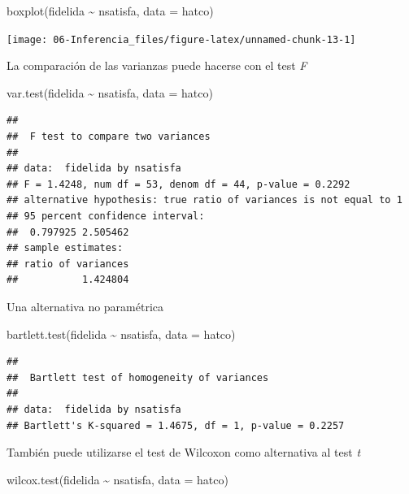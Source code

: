 \documentclass[
]{book}
\newenvironment{Shaded}{\begin{snugshade}}{\end{snugshade}}
\newcommand{\AttributeTok}[1]{\textcolor[rgb]{0.77,0.63,0.00}{#1}}
\newcommand{\FunctionTok}[1]{\textcolor[rgb]{0.00,0.00,0.00}{#1}}
\newcommand{\NormalTok}[1]{#1}
\newcommand{\SpecialCharTok}[1]{\textcolor[rgb]{0.00,0.00,0.00}{#1}}
\theoremstyle{break}
\theoremstyle{nonumberplain}
\begin{document}
\begin{Shaded}
\begin{Highlighting}[]
\FunctionTok{boxplot}\NormalTok{(fidelida }\SpecialCharTok{\textasciitilde{}}\NormalTok{ nsatisfa, }\AttributeTok{data =}\NormalTok{ hatco)}
\end{Highlighting}
\end{Shaded}

\begin{center}\texttt{[image: 06-Inferencia\_files/figure-latex/unnamed-chunk-13-1]} \end{center}

La comparación de las varianzas puede hacerse con el test \emph{F}

\begin{Shaded}
\begin{Highlighting}[]
\FunctionTok{var.test}\NormalTok{(fidelida }\SpecialCharTok{\textasciitilde{}}\NormalTok{ nsatisfa, }\AttributeTok{data =}\NormalTok{ hatco)}
\end{Highlighting}
\end{Shaded}

\begin{verbatim}
## 
##  F test to compare two variances
## 
## data:  fidelida by nsatisfa
## F = 1.4248, num df = 53, denom df = 44, p-value = 0.2292
## alternative hypothesis: true ratio of variances is not equal to 1
## 95 percent confidence interval:
##  0.797925 2.505462
## sample estimates:
## ratio of variances 
##           1.424804
\end{verbatim}

Una alternativa no paramétrica

\begin{Shaded}
\begin{Highlighting}[]
\FunctionTok{bartlett.test}\NormalTok{(fidelida }\SpecialCharTok{\textasciitilde{}}\NormalTok{ nsatisfa, }\AttributeTok{data =}\NormalTok{ hatco)}
\end{Highlighting}
\end{Shaded}

\begin{verbatim}
## 
##  Bartlett test of homogeneity of variances
## 
## data:  fidelida by nsatisfa
## Bartlett's K-squared = 1.4675, df = 1, p-value = 0.2257
\end{verbatim}

También puede utilizarse el test de Wilcoxon como alternativa al test \emph{t}

\begin{Shaded}
\begin{Highlighting}[]
\FunctionTok{wilcox.test}\NormalTok{(fidelida }\SpecialCharTok{\textasciitilde{}}\NormalTok{ nsatisfa, }\AttributeTok{data =}\NormalTok{ hatco)}
\end{Highlighting}
\end{Shaded}
\end{document}
